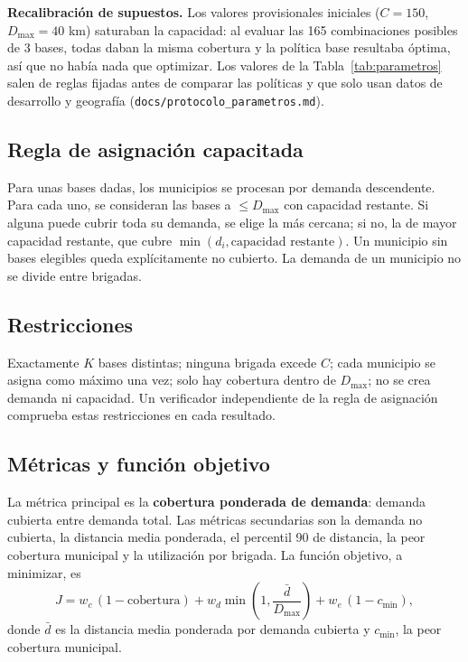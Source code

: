 \documentclass[11pt,letterpaper]{article}
\newcommand{\cod}[1]{\texttt{#1}}
\begin{document}
\textbf{Recalibración de supuestos.} Los valores provisionales iniciales ($C=150$, $D_{\max}=40$ km) saturaban la capacidad: al evaluar las 165 combinaciones posibles de 3 bases, todas daban la misma cobertura y la política base resultaba óptima, así que no había nada que optimizar. Los valores de la Tabla~\ref{tab:parametros} salen de reglas fijadas antes de comparar las políticas y que solo usan datos de desarrollo y geografía (\cod{docs/protocolo\_parametros.md}).

\subsection{Regla de asignación capacitada}

Para unas bases dadas, los municipios se procesan por demanda descendente. Para cada uno, se consideran las bases a $\le D_{\max}$ con capacidad restante. Si alguna puede cubrir toda su demanda, se elige la más cercana; si no, la de mayor capacidad restante, que cubre $\min(d_i,\text{capacidad restante})$. Un municipio sin bases elegibles queda explícitamente no cubierto. La demanda de un municipio no se divide entre brigadas.

\subsection{Restricciones}

Exactamente $K$ bases distintas; ninguna brigada excede $C$; cada municipio se asigna como máximo una vez; solo hay cobertura dentro de $D_{\max}$; no se crea demanda ni capacidad. Un verificador independiente de la regla de asignación comprueba estas restricciones en cada resultado.

\subsection{Métricas y función objetivo}

La métrica principal es la \textbf{cobertura ponderada de demanda}: demanda cubierta entre demanda total. Las métricas secundarias son la demanda no cubierta, la distancia media ponderada, el percentil 90 de distancia, la peor cobertura municipal y la utilización por brigada. La función objetivo, a minimizar, es
\begin{equation}
J = w_c\,(1-\text{cobertura}) + w_d \min\!\left(1, \frac{\bar d}{D_{\max}}\right) + w_e\,(1-c_{\min}),
\end{equation}
donde $\bar d$ es la distancia media ponderada por demanda cubierta y $c_{\min}$, la peor cobertura municipal.
\end{document}
